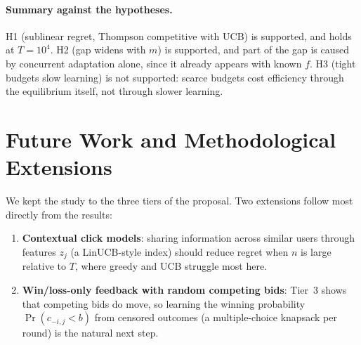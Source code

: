 \documentclass[11pt]{article}
\theoremstyle{remark}
\begin{document}
\paragraph{Summary against the hypotheses.} H1 (sublinear regret, Thompson competitive with UCB) is
supported, and holds at $T=10^4$. H2 (gap widens with $m$) is supported, and part of the gap is caused
by concurrent adaptation alone, since it already appears with known $f$. H3 (tight budgets slow
learning) is not supported: scarce budgets cost efficiency through the equilibrium itself, not
through slower learning.

\section{Future Work and Methodological Extensions}\label{sec:supp_future}
We kept the study to the three tiers of the proposal. Two extensions follow most directly from
the results:
\begin{enumerate}[leftmargin=*]
  \item \textbf{Contextual click models}: sharing information across similar users through
        features $z_j$ (a LinUCB-style index) should reduce regret when $n$ is large relative to $T$, where
        greedy and UCB struggle most here.
  \item \textbf{Win/loss-only feedback with random competing bids}: Tier~3 shows that competing bids do move, so learning the winning probability $\Pr(c_{-i,j}<b)$ from
        censored outcomes (a multiple-choice knapsack per round) is the natural next step.
\end{enumerate}

\end{document}
